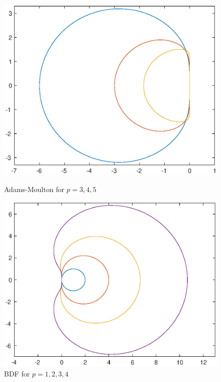 \documentclass[twoside,a4paper]{article}
\begin{document}
\begin{figure}[H]
\begin{minipage}[t]{0.4\linewidth}
        \centering
        \includegraphics[width=0.9\linewidth]{figure/ex-11-139.eps}
        \caption*{Adams-Moulton for $p=3,4,5$}
    \end{minipage}
    \hspace{1em}
    \begin{minipage}[t]{0.4\linewidth}
        \centering
        \includegraphics[width=0.9\linewidth]{figure/ex-11-140.eps}
        \caption*{BDF for $p=1,2,3,4$}
    \end{minipage}
\end{figure}
\end{document}
